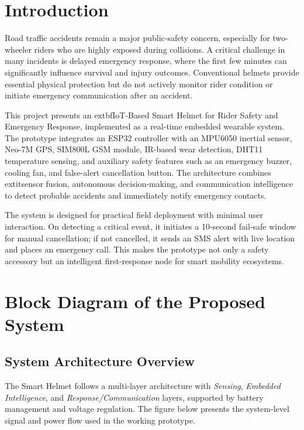 \documentclass[10pt,a4paper]{article}
\begin{document}
\section{Introduction}

Road traffic accidents remain a major public-safety concern, especially for two-wheeler riders who are highly exposed during collisions. A critical challenge in many incidents is delayed emergency response, where the first few minutes can significantly influence survival and injury outcomes. Conventional helmets provide essential physical protection but do not actively monitor rider condition or initiate emergency communication after an accident.

This project presents an 	extbf{IoT-Based Smart Helmet for Rider Safety and Emergency Response}, implemented as a real-time embedded wearable system. The prototype integrates an ESP32 controller with an MPU6050 inertial sensor, Neo-7M GPS, SIM800L GSM module, IR-based wear detection, DHT11 temperature sensing, and auxiliary safety features such as an emergency buzzer, cooling fan, and false-alert cancellation button. The architecture combines 	extit{sensor fusion}, autonomous decision-making, and communication intelligence to detect probable accidents and immediately notify emergency contacts.

The system is designed for practical field deployment with minimal user interaction. On detecting a critical event, it initiates a 10-second fail-safe window for manual cancellation; if not cancelled, it sends an SMS alert with live location and places an emergency call. This makes the prototype not only a safety accessory but an intelligent first-response node for smart mobility ecosystems.


\section{Block Diagram of the Proposed System}

\subsection{System Architecture Overview}

The Smart Helmet follows a multi-layer architecture with \textit{Sensing}, \textit{Embedded Intelligence}, and \textit{Response/Communication} layers, supported by battery management and voltage regulation. The figure below presents the system-level signal and power flow used in the working prototype.
\end{document}
